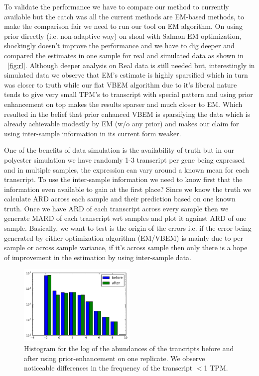 \documentclass{article}
\begin{document}
To validate the performance we have to compare our method to currently available but the catch was all the current methods are EM-based methods, to make the comparison fair we need to run our tool on EM algorithm. On using prior directly (i.e. non-adaptive way) on shoal with Salmon EM optimization, shockingly doesn't improve the performance and we have to dig deeper and compared the estimates in one sample for real and simulated data as shown in ~\cref{fig:rl}. Although deeper analysis on Real data is still needed but, interestingly in simulated data we observe that EM's estimate is highly sparsified which in turn was closer to truth while our flat VBEM algorithm due to it's liberal nature tends to give very small TPM's to transcript with special pattern and using prior enhancement on top makes the results sparser and much closer to EM. Which resulted in the belief that prior enhanced VBEM is sparsifying the data which is already achievable modestly by EM (w/o any prior) and makes our claim for using inter-sample information in its current form weaker.

One of the benefits of data simulation is the availability of truth but in our polyester simulation we have randomly 1-3 transcript per gene being expressed and in multiple samples, the expression can vary around a known mean for each transcript. To use the inter-sample information we need to know first that the information even available to gain at the first place? Since we know the truth we calculate ARD across each sample and their prediction based on one known truth. Once we have ARD of each transcript across every sample then we generate MARD of each transcript wrt samples and plot it against ARD of one sample. Basically, we want to test is the origin of the errors i.e. if the error being generated by either optimization algorithm (EM/VBEM) is mainly due to per sample or across sample variance, if it's across sample then only there is a hope of improvement in the estimation by using inter-sample data.

\begin{figure}
  \centering
      \includegraphics[width=0.5\textwidth]{figures/befAft.png}
      \caption{\label{fig:befaft} Histogram for the log of the abundances of the trancripts before and after using prior-enhancement on one replicate. We observe noticeable differences in the frequency of the transcript $<$1 TPM.}
\end{figure}
\end{document}
